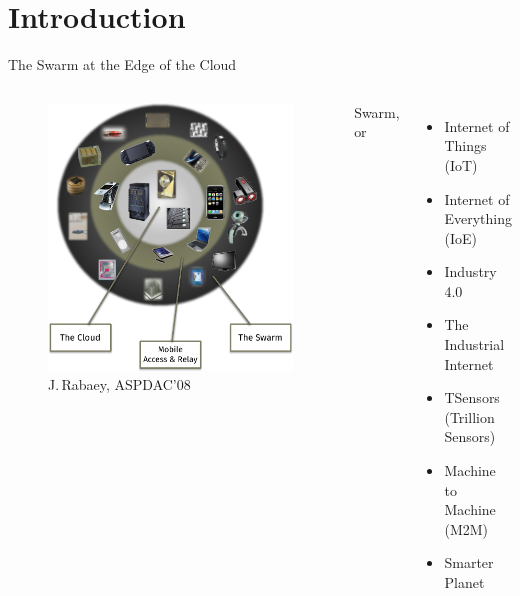 \section{Introduction}

\begin{frame}{The Swarm at the Edge of the Cloud}
  \pause

  \begin{columns}
    \begin{figure}
      \includegraphics[width=\textwidth]{figures/swarm_jan.pdf}
      \caption{J.\,Rabaey, ASPDAC'08}
    \end{figure}

    \pause

    Swarm, or
    \begin{itemize}
    \item Internet of Things (IoT)
    \item Internet of Everything (IoE)
    \item Industry 4.0
    \item The Industrial Internet
    \item TSensors (Trillion Sensors)
    \item Machine to Machine (M2M)
    \item Smarter Planet
    \end{itemize}
  \end{columns}
\end{frame}

